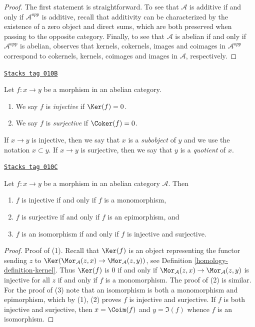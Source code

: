 \begin{proof}
The first statement is straightforward.
To see that $\mathcal{A}$ is additive if and only if $\mathcal{A}^{opp}$
is additive, recall that additivity can be characterized by
the existence of a zero object and direct sums, which are both
preserved when passing to the opposite category.
Finally, to see that
$\mathcal{A}$ is abelian if and only if $\mathcal{A}^{opp}$ is abelian,
observes that kernels, cokernels, images and coimages in
$\mathcal{A}^{opp}$ correspond to
cokernels, kernels, coimages and images in $\mathcal{A}$,
respectively.
\end{proof}

\begin{definition}
\label{homology-definition-injective-surjective}
\href{https://stacks.math.columbia.edu/tag/010B}{\texttt{Stacks tag 010B}}

Let $f : x \to y$ be a morphism in an abelian category.
\begin{enumerate}
\item We say $f$ is {\it injective} if $\Ker(f) = 0$.
\item We say $f$ is {\it surjective} if $\Coker(f) = 0$.
\end{enumerate}
If $x \to y$ is injective, then we say that $x$ is a {\it subobject}
of $y$ and we use the notation $x \subset y$. If $x \to y$ is
surjective, then we say that $y$ is a {\it quotient} of $x$.
\end{definition}

\begin{lemma}
\label{homology-lemma-characterize-injective}
\href{https://stacks.math.columbia.edu/tag/010C}{\texttt{Stacks tag 010C}}

Let $f : x \to y$ be a morphism in an abelian category $\mathcal{A}$. Then
\begin{enumerate}
\item $f$ is injective if and only if $f$ is a monomorphism,
\item $f$ is surjective if and only if $f$ is an epimorphism, and
\item $f$ is an isomorphism if and only if $f$ is injective and surjective.
\end{enumerate}
\end{lemma}

\begin{proof}

Proof of (1). Recall that $\Ker(f)$ is an object representing the
functor sending $z$ to
$\Ker(\Mor_\mathcal{A}(z, x) \to \Mor_\mathcal{A}(z, y))$, see
Definition \ref{homology-definition-kernel}.
Thus $\Ker(f)$ is $0$ if and only if
$\Mor_\mathcal{A}(z, x) \to \Mor_\mathcal{A}(z, y)$
is injective for all $z$ if and only if $f$ is a monomorphism.
The proof of (2) is similar.
For the proof of (3) note that an isomorphism is both a monomorphism
and epimorphism, which by (1), (2) proves $f$ is injective
and surjective. If $f$ is both injective and surjective, then
$x = \Coim(f)$ and $y = \Im(f)$ whence $f$ is an isomorphism.
\end{proof}

